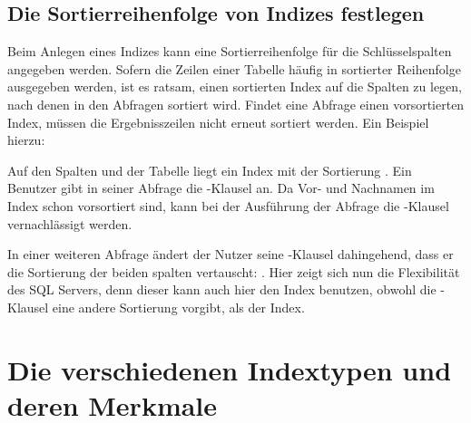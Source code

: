       \subsection{Die Sortierreihenfolge von Indizes festlegen}
        \label{indexsort}
        Beim Anlegen eines Indizes kann eine Sortierreihenfolge für die
        Schlüsselspalten angegeben werden. Sofern die Zeilen einer Tabelle
        häufig in sortierter Reihenfolge ausgegeben werden, ist es ratsam,
        einen sortierten Index auf die Spalten zu legen, nach denen in den
        Abfragen sortiert wird. Findet eine Abfrage einen vorsortierten Index,
        müssen die Ergebnisszeilen nicht erneut sortiert werden.
\clearpage
        Ein Beispiel hierzu: 
        
        Auf den Spalten  und  der
        Tabelle  liegt ein Index mit der Sortierung
        . Ein Benutzer gibt in
        seiner Abfrage die \ORDERBY-Klausel  an. Da Vor- und Nachnamen im Index schon
        vorsortiert sind, kann bei der Ausführung der Abfrage die
        \ORDERBY-Klausel vernachlässigt werden.
        
        In einer weiteren Abfrage ändert der Nutzer seine \ORDERBY-Klausel
        dahingehend, dass er die Sortierung der beiden spalten vertauscht: 
        . Hier zeigt sich nun
        die Flexibilität des SQL Servers, denn dieser kann auch hier den Index
        benutzen, obwohl die \ORDERBY-Klausel eine andere Sortierung vorgibt,
        als der Index.
        \begin{literaturinternet}
          \item \cite{jj835095}
        \end{literaturinternet}
    \section{Die verschiedenen Indextypen und deren Merkmale}
